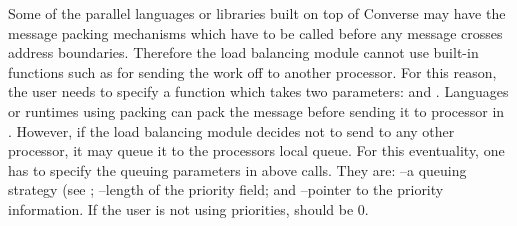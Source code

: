 Some of the parallel languages or libraries built on top of Converse
may have the message packing mechanisms which have to be called before
any message crosses address boundaries. Therefore the load balancing
module cannot use built-in functions such as 
for sending the work off to another processor. For this reason, the
user needs to specify a function  which takes two
parameters:   and . Languages or
runtimes using packing can pack the message before sending it to
processor  in . However, if the load
balancing module decides not to send  to any other
processor, it may queue it to the processors local queue. For this
eventuality, one has to specify the queuing parameters in above calls.
They are:  --a queuing strategy (see
; --length of the priority
field; and --pointer to the priority information. If the
user is not using priorities,  should be 0.


%
%
%
%

